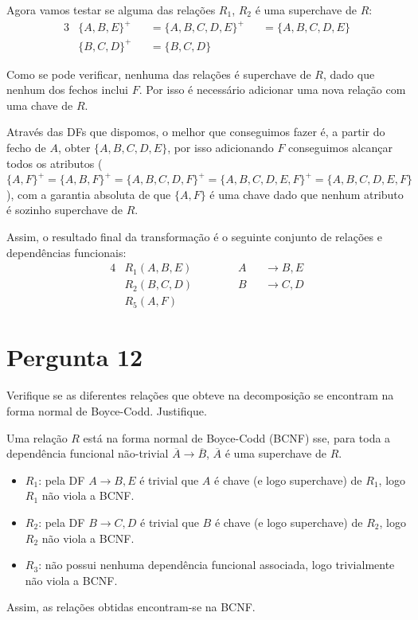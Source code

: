{Agora vamos testar se alguma das relações $R_1$, $R_2$ é uma superchave de $R$:
\begin{alignat*}{3}
    & \{A, B, E\}^+ &&= \{A, B, C, D, E\}^+ &&= \{A,B,C,D,E\} \\
    & \{B, C, D\}^+ &&= \{B, C, D\}         &&
\end{alignat*}

Como se pode verificar, nenhuma das relações é superchave de $R$, dado que nenhum dos fechos inclui $F$. Por isso é necessário adicionar uma nova relação com uma chave de $R$.

Através das DFs que dispomos, o melhor que conseguimos fazer é, a partir do fecho de $A$, obter $\{A, B, C, D, E\}$, por isso adicionando $F$ conseguimos alcançar todos os atributos ($\{A,F\}^+ = \{A,B,F\}^+ = \{A,B,C,D,F\}^+ = \{A,B,C,D,E,F\}^+ = \{A,B,C,D,E,F\}$), com a garantia absoluta de que $\{A,F\}$ é uma chave dado que nenhum atributo é sozinho superchave de $R$.

Assim, o resultado final da transformação é o seguinte conjunto de relações e dependências funcionais:
\begin{alignat*}{4}
    & R_1 (A, B, E) &&~~~~&& A && \rightarrow B, E\\
    & R_2 (B, C, D) &&~~~~&& B && \rightarrow C, D\\
    & R_5 (A, F)
\end{alignat*}

\section{Pergunta 12}
Verifique se as diferentes relações que obteve na decomposição se encontram na forma normal de Boyce-Codd. Justifique.

\ansseparator

Uma relação $R$ está na forma normal de Boyce-Codd (BCNF) sse, para toda a dependência funcional não-trivial $\overline{A} \rightarrow \overline{B}$, $\overline{A}$ é uma superchave de $R$.
\begin{itemize}
    \item $R_1$: pela DF $A \rightarrow B, E$ é trivial que $A$ é chave (e logo superchave) de $R_1$, logo $R_1$ não viola a BCNF.
    \item $R_2$: pela DF $B \rightarrow C, D$ é trivial que $B$ é chave (e logo superchave) de $R_2$, logo $R_2$ não viola a BCNF.
    \item $R_3$: não possui nenhuma dependência funcional associada, logo trivialmente não viola a BCNF.
\end{itemize}
Assim, as relações obtidas encontram-se na BCNF.

}
